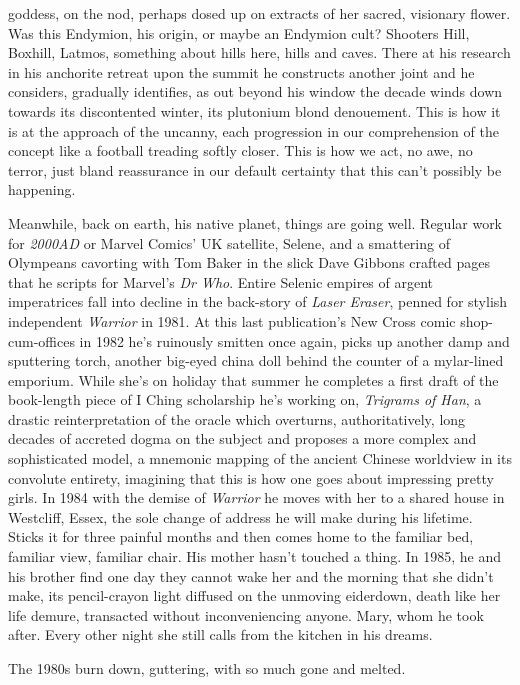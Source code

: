 \documentclass[
]{article}
\begin{document}
goddess, on the nod, perhaps dosed up on extracts of her sacred,
visionary flower. Was this Endymion, his origin, or maybe an Endymion
cult? Shooters Hill, Boxhill, Latmos, something about hills here, hills
and caves. There at his research in his anchorite retreat upon the
summit he constructs another joint and he considers, gradually
identifies, as out beyond his window the decade winds down towards its
discontented winter, its plutonium blond denouement. This is how it is
at the approach of the uncanny, each progression in our comprehension of
the concept like a football treading softly closer. This is how we act,
no awe, no terror, just bland reassurance in our default certainty that
this can't possibly be happening. \par
Meanwhile, back on earth, his native planet, things are going
well. Regular work for \emph{2000AD} or Marvel Comics' UK satellite,
Selene, and a smattering of Olympeans cavorting with Tom Baker in the
slick Dave Gibbons crafted pages that he scripts for Marvel's \emph{Dr
Who}. Entire Selenic empires of argent imperatrices fall into decline in
the back-story of \emph{Laser Eraser}, penned for stylish independent
\emph{Warrior} in 1981. At this last publication's New Cross comic
shop-cum-offices in 1982 he's ruinously smitten once again, picks up
another damp and sputtering torch, another big-eyed china doll behind
the counter of a mylar-lined emporium. While she's on holiday that
summer he completes a first draft of the book-length piece of I Ching
scholarship he's working on, \emph{Trigrams of Han}, a drastic
reinterpretation of the oracle which overturns, authoritatively, long
decades of accreted dogma on the subject and proposes a more complex and
sophisticated model, a mnemonic mapping of the ancient Chinese worldview
in its convolute entirety, imagining that this is how one goes about
impressing pretty girls. In 1984 with the demise of \emph{Warrior} he
moves with her to a shared house in Westcliff, Essex, the sole change of
address he will make during his lifetime. Sticks it for three painful
months and then comes home to the familiar bed, familiar view, familiar
chair. His mother hasn't touched a thing. In 1985, he and his brother
find one day they cannot wake her and the morning that she didn't make,
its pencil-crayon light diffused on the unmoving eiderdown, death like
her life demure, transacted without inconveniencing anyone. Mary, whom
he took after. Every other night she still calls from the kitchen in his
dreams. \par
The 1980s burn down, guttering, with so much gone and melted.
\end{document}
